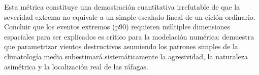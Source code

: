 Esta métrica constituye una demostración cuantitativa irrefutable de que la severidad extrema no equivale a un simple escalado lineal de un ciclón ordinario. Concluir que los eventos extremos (p90) requieren múltiples dimensiones espaciales para ser explicados es crítico para la modelación numérica: demuestra que parametrizar vientos destructivos asumiendo los patrones simples de la climatología media subestimará sistemáticamente la agresividad, la naturaleza asimétrica y la localización real de las ráfagas.